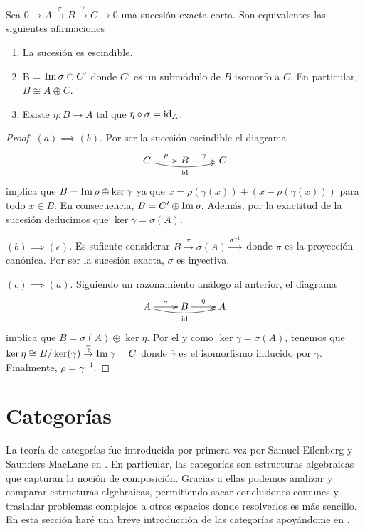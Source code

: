 \begin{lema}
	\label{lem:escision}
	Sea $0 \rightarrow A \xrightarrow{\sigma} B \xrightarrow{\gamma} C \rightarrow 0$ una sucesión exacta corta. Son equivalentes las siguientes afirmaciones
	\begin{enumerate}
		\item La sucesión es escindible.
		\item B = $\operatorname{Im} \sigma \oplus C'$ donde $C'$ es un submódulo de $B$ isomorfo a $C$. En particular, $B \cong A \oplus C$.
		\item Existe $\eta : B \to A$ tal que $\eta \circ \sigma = \operatorname{id}_A$.
	\end{enumerate}
\end{lema}
\begin{proof}
	$(a) \implies (b)$. Por ser la sucesión escindible el diagrama
	\[
		\xymatrix{
			C \ar@{->}[r]^{\rho} \ar@/_/@{->}[rr]_{\id} & B \ar@{->}[r]^{\gamma} & C
		}
	\]
	implica que $B = \operatorname{Im} \rho \oplus \ker \gamma$ ya que $x = \rho(\gamma(x)) + (x - \rho(\gamma(x)))$ para todo $x \in B$. En consecuencia, $B = C' \oplus \operatorname{Im} \rho$. Además, por la exactitud de la sucesión deducimos que $\ker \gamma = \sigma(A)$.
	
	$(b) \implies (c)$. Es sufiente considerar $B \overset{\pi}{\to} \sigma(A) \overset{\sigma^{-1}}{\to}$ donde $\pi$ es la proyección canónica. Por ser la sucesión exacta, $\sigma$ es inyectiva.
	
	$(c) \implies (a)$. Siguiendo un razonamiento análogo al anterior, el diagrama
	\[
	\xymatrix{
		A \ar@{->}[r]^{\sigma} \ar@/_/@{->}[rr]_{\id} & B \ar@{->}[r]^{\eta} & A
	}
	\]
	implica que $B = \sigma(A) \oplus \ker \eta$. Por el  y como $\ker \gamma = \sigma(A)$, tenemos que $\ker \eta \cong B/\ker(\gamma) \overset{\overline{\gamma}}{\to} \operatorname{Im} \gamma = C$ donde $\overline{\gamma}$ es el isomorfismo inducido por $\gamma$. Finalmente, $\rho = \overline{\gamma}^{-1}$.
\end{proof}

\section{Categorías}
\label{sec:cat}

La teoría de categorías fue introducida por primera vez por Samuel Eilenberg y Saunders MacLane en \cite{eilenberg1945general}. En particular, las categorías son estructuras algebraicas que capturan la noción de composición. Gracias a ellas podemos analizar y comparar estructuras algebraicas, permitiendo sacar conclusiones comunes y trasladar problemas complejos a otros espacios donde resolverlos es más sencillo. En esta sección haré una breve introducción de las categorías apoyándome en \cite{mac2013categories}.

